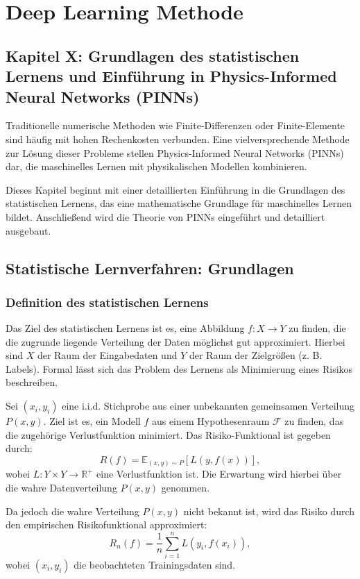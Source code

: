\chapter{Deep Learning Methode}
\label{cha:3}

\section*{Kapitel X: Grundlagen des statistischen Lernens und Einführung in Physics-Informed Neural Networks (PINNs)}

Traditionelle numerische Methoden wie Finite-Differenzen oder Finite-Elemente sind häufig mit hohen Rechenkosten verbunden. Eine vielversprechende Methode zur Lösung dieser Probleme stellen Physics-Informed Neural Networks (PINNs) dar, die maschinelles Lernen mit physikalischen Modellen kombinieren.

Dieses Kapitel beginnt mit einer detaillierten Einführung in die Grundlagen des statistischen Lernens, das eine mathematische Grundlage für maschinelles Lernen bildet. Anschließend wird die Theorie von PINNs eingeführt und detailliert ausgebaut.

\section{Statistische Lernverfahren: Grundlagen}

\subsection{Definition des statistischen Lernens}
Das Ziel des statistischen Lernens ist es, eine Abbildung $f : X \to Y$ zu finden, die die zugrunde liegende Verteilung der Daten möglichst gut approximiert. Hierbei sind $X$ der Raum der Eingabedaten und $Y$ der Raum der Zielgrößen (z. B. Labels). Formal lässt sich das Problem des Lernens als Minimierung eines Risikos beschreiben.

Sei $(x_i, y_i)$ eine i.i.d. Stichprobe aus einer unbekannten gemeinsamen Verteilung $P(x, y)$. Ziel ist es, ein Modell $f$ aus einem Hypothesenraum $\mathcal{F}$ zu finden, das die zugehörige Verlustfunktion minimiert. Das Risiko-Funktional ist gegeben durch:
\[
R(f) = \mathbb{E}_{(x, y) \sim P}[L(y, f(x))],
\]
wobei $L : Y \times Y \to \mathbb{R}^+$ eine Verlustfunktion ist. Die Erwartung wird hierbei über die wahre Datenverteilung $P(x, y)$ genommen.

Da jedoch die wahre Verteilung $P(x, y)$ nicht bekannt ist, wird das Risiko durch den empirischen Risikofunktional approximiert:
\[
R_n(f) = \frac{1}{n} \sum_{i=1}^n L(y_i, f(x_i)),
\]
wobei $(x_i, y_i)$ die beobachteten Trainingsdaten sind.

